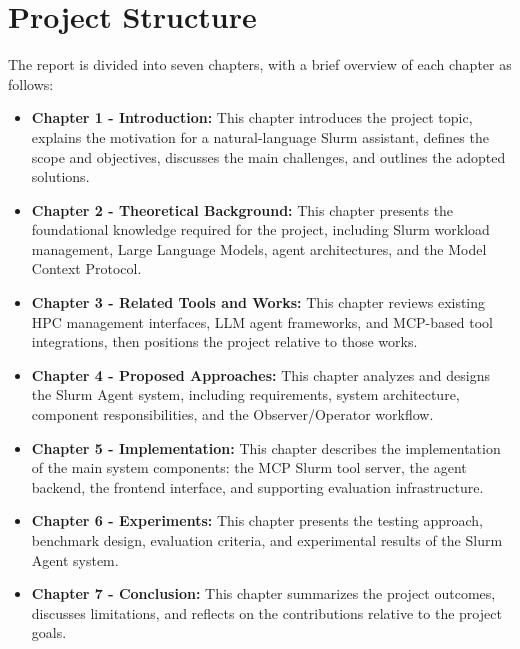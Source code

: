 \section{Project Structure}
\label{sec:thesis-structure}

The report is divided into seven chapters, with a brief overview of each chapter as follows:

\begin{itemize}
	\item \textbf{Chapter 1 - Introduction:} This chapter introduces the project topic, explains the motivation for a natural-language Slurm assistant, defines the scope and objectives, discusses the main challenges, and outlines the adopted solutions.

	\item \textbf{Chapter 2 - Theoretical Background:} This chapter presents the foundational knowledge required for the project, including Slurm workload management, Large Language Models, agent architectures, and the Model Context Protocol.

	\item \textbf{Chapter 3 - Related Tools and Works:} This chapter reviews existing HPC management interfaces, LLM agent frameworks, and MCP-based tool integrations, then positions the project relative to those works.

	\item \textbf{Chapter 4 - Proposed Approaches:} This chapter analyzes and designs the Slurm Agent system, including requirements, system architecture, component responsibilities, and the Observer/Operator workflow.

	\item \textbf{Chapter 5 - Implementation:} This chapter describes the implementation of the main system components: the MCP Slurm tool server, the agent backend, the frontend interface, and supporting evaluation infrastructure.

	\item \textbf{Chapter 6 - Experiments:} This chapter presents the testing approach, benchmark design, evaluation criteria, and experimental results of the Slurm Agent system.

	\item \textbf{Chapter 7 - Conclusion:} This chapter summarizes the project outcomes, discusses limitations, and reflects on the contributions relative to the project goals.
\end{itemize}

